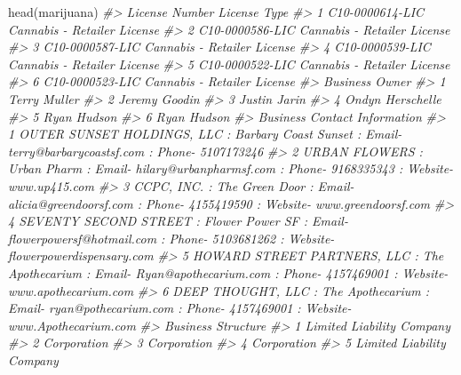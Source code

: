 \documentclass[
]{krantz}
\makeatletter
\newenvironment{Shaded}{\begin{snugshade}}{\end{snugshade}}
\newcommand{\CommentTok}[1]{\textcolor[rgb]{0.37,0.37,0.37}{\textit{#1}}}
\newcommand{\FunctionTok}[1]{\textcolor[rgb]{0,0,0}{#1}}
\newcommand{\NormalTok}[1]{#1}
\newenvironment{kframe}{%
\medskip{}
\setlength{\fboxsep}{.8em}
 \def\at@end@of@kframe{}%
 \ifinner\ifhmode%
  \def\at@end@of@kframe{\end{minipage}}%
  \begin{minipage}{\columnwidth}%
 \fi\fi%
 \def\FrameCommand##1{\hskip\@totalleftmargin \hskip-\fboxsep
 \colorbox{shadecolor}{##1}\hskip-\fboxsep
     \hskip-\linewidth \hskip-\@totalleftmargin \hskip\columnwidth}%
 \MakeFramed {\advance\hsize-\width
   \@totalleftmargin\z@ \linewidth\hsize
   \@setminipage}}%
 {\par\unskip\endMakeFramed%
 \at@end@of@kframe}
\renewenvironment{Shaded}{\begin{kframe}}{\end{kframe}}
\makeatother
\begin{document}
\begin{Shaded}
\begin{Highlighting}[]
\FunctionTok{head}\NormalTok{(marijuana)}
\CommentTok{\#\textgreater{}    License Number                License Type}
\CommentTok{\#\textgreater{} 1 C10{-}0000614{-}LIC Cannabis {-} Retailer License}
\CommentTok{\#\textgreater{} 2 C10{-}0000586{-}LIC Cannabis {-} Retailer License}
\CommentTok{\#\textgreater{} 3 C10{-}0000587{-}LIC Cannabis {-} Retailer License}
\CommentTok{\#\textgreater{} 4 C10{-}0000539{-}LIC Cannabis {-} Retailer License}
\CommentTok{\#\textgreater{} 5 C10{-}0000522{-}LIC Cannabis {-} Retailer License}
\CommentTok{\#\textgreater{} 6 C10{-}0000523{-}LIC Cannabis {-} Retailer License}
\CommentTok{\#\textgreater{}     Business Owner}
\CommentTok{\#\textgreater{} 1     Terry Muller}
\CommentTok{\#\textgreater{} 2    Jeremy Goodin}
\CommentTok{\#\textgreater{} 3     Justin Jarin}
\CommentTok{\#\textgreater{} 4 Ondyn Herschelle}
\CommentTok{\#\textgreater{} 5      Ryan Hudson}
\CommentTok{\#\textgreater{} 6      Ryan Hudson}
\CommentTok{\#\textgreater{}                                                                                                           Business Contact Information}
\CommentTok{\#\textgreater{} 1                             OUTER SUNSET HOLDINGS, LLC  : Barbary Coast Sunset : Email{-} terry@barbarycoastsf.com : Phone{-} 5107173246}
\CommentTok{\#\textgreater{} 2                           URBAN FLOWERS  : Urban Pharm : Email{-} hilary@urbanpharmsf.com : Phone{-} 9168335343 : Website{-} www.up415.com}
\CommentTok{\#\textgreater{} 3                      CCPC, INC.  : The Green Door : Email{-} alicia@greendoorsf.com : Phone{-} 4155419590 : Website{-} www.greendoorsf.com}
\CommentTok{\#\textgreater{} 4 SEVENTY SECOND STREET  : Flower Power SF : Email{-} flowerpowersf@hotmail.com : Phone{-} 5103681262 : Website{-} flowerpowerdispensary.com}
\CommentTok{\#\textgreater{} 5   HOWARD STREET PARTNERS, LLC  : The Apothecarium : Email{-} Ryan@apothecarium.com : Phone{-} 4157469001 : Website{-} www.apothecarium.com}
\CommentTok{\#\textgreater{} 6              DEEP THOUGHT, LLC  : The Apothecarium : Email{-} ryan@pothecarium.com : Phone{-} 4157469001 : Website{-} www.Apothecarium.com}
\CommentTok{\#\textgreater{}          Business Structure}
\CommentTok{\#\textgreater{} 1 Limited Liability Company}
\CommentTok{\#\textgreater{} 2               Corporation}
\CommentTok{\#\textgreater{} 3               Corporation}
\CommentTok{\#\textgreater{} 4               Corporation}
\CommentTok{\#\textgreater{} 5 Limited Liability Company}

\end{Highlighting}
\end{Shaded}
\end{document}
